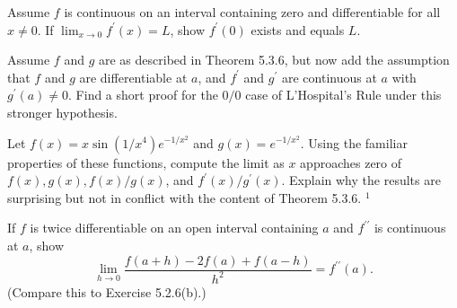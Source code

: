 \begin{exercise}
  Assume $f$ is continuous on an interval containing zero and differentiable for all $x \neq 0$. If $\lim _{x \rightarrow 0} f^{\prime}(x)=L$, show $f^{\prime}(0)$ exists and equals $L$.
\end{exercise}
\begin{solution}
  \TODO
\end{solution}

\begin{exercise}
  Assume $f$ and $g$ are as described in Theorem 5.3.6, but now add the assumption that $f$ and $g$ are differentiable at $a$, and $f^{\prime}$ and $g^{\prime}$ are continuous at $a$ with $g^{\prime}(a) \neq 0$. Find a short proof for the $0 / 0$ case of L'Hospital's Rule under this stronger hypothesis.
\end{exercise}
\begin{solution}
  \TODO
\end{solution}

\begin{exercise}
  Let $f(x)=x \sin \left(1 / x^{4}\right) e^{-1 / x^{2}}$ and $g(x)=e^{-1 / x^{2}}$. Using the familiar properties of these functions, compute the limit as $x$ approaches zero of $f(x), g(x), f(x) / g(x)$, and $f^{\prime}(x) / g^{\prime}(x)$. Explain why the results are surprising but not in conflict with the content of Theorem 5.3.6. ${ }^{1}$
\end{exercise}
\begin{solution}
  \TODO
\end{solution}

\begin{exercise}
\end{exercise}
\begin{solution}
  \TODO
\end{solution}

\begin{exercise}
  If $f$ is twice differentiable on an open interval containing $a$ and $f^{\prime \prime}$ is continuous at $a$, show
  $$
  \lim _{h \rightarrow 0} \frac{f(a+h)-2 f(a)+f(a-h)}{h^{2}}=f^{\prime \prime}(a) .
  $$
  (Compare this to Exercise 5.2.6(b).)
\end{exercise}
\begin{solution}
  \TODO
\end{solution}

